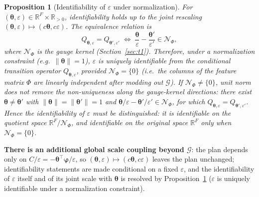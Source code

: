 \documentclass[11pt,a4paper]{article}
\newtheorem{proposition}[theorem]{Proposition}
\theoremstyle{remark}
\begin{document}
\begin{proposition}[Identifiability of $\varepsilon$ under normalization]\label{prop:eps_ident}
For $(\bm{\theta},\varepsilon)\in\mathbb{R}^F\times\mathbb{R}_{>0}$, identifiability holds
up to the joint rescaling $(\bm{\theta},\varepsilon)\mapsto(c\bm{\theta},c\varepsilon)$.
The equivalence relation is
\[
Q_{\bm{\theta},\varepsilon}=Q_{\bm{\theta}',\varepsilon'}
\;\Longleftrightarrow\;
\frac{\bm{\theta}}{\varepsilon}-\frac{\bm{\theta}'}{\varepsilon'}\in\mathcal{N}_\Phi,
\]
where $\mathcal{N}_\Phi$ is the gauge kernel (Section~\ref{sec:t1}). Therefore, under a
normalization constraint (e.g.\ $\|\bm{\theta}\|=1$), $\varepsilon$ is uniquely
identifiable from the conditional transition operator $Q_{\bm{\theta},\varepsilon}$,
provided $\mathcal{N}_\Phi=\{0\}$ (i.e.\ the columns of the feature matrix $\Phi$ are
linearly independent after modding out $\mathcal{G}$). If $\mathcal{N}_\Phi\neq\{0\}$, unit
norm does not remove the non-uniqueness along the gauge-kernel directions: there exist
$\bm{\theta}\neq\bm{\theta}'$ with $\|\bm{\theta}\|=\|\bm{\theta}'\|=1$ and
$\bm{\theta}/\varepsilon-\bm{\theta}'/\varepsilon'\in\mathcal{N}_\Phi$, for which
$Q_{\bm{\theta},\varepsilon}=Q_{\bm{\theta}',\varepsilon'}$. Hence the identifiability of
$\varepsilon$ must be distinguished: it is identifiable on the quotient space
$\mathbb{R}^F/\mathcal{N}_\Phi$, and identifiable on the original space $\mathbb{R}^F$ only
when $\mathcal{N}_\Phi=\{0\}$.
\end{proposition}

\textbf{There is an additional global scale coupling beyond $\mathcal{G}$}: the plan
depends only on $C/\varepsilon=-\bm{\theta}^{\top}\bm{\varphi}/\varepsilon$, so
$(\bm{\theta},\varepsilon)\mapsto(c\bm{\theta},c\varepsilon)$ leaves the plan unchanged;
identifiability statements are made conditional on a fixed $\varepsilon$, and the
identifiability of $\varepsilon$ itself and of its joint scale with $\bm{\theta}$ is
resolved by Proposition~\ref{prop:eps_ident} ($\varepsilon$ is uniquely identifiable under
a normalization constraint).
\end{document}
